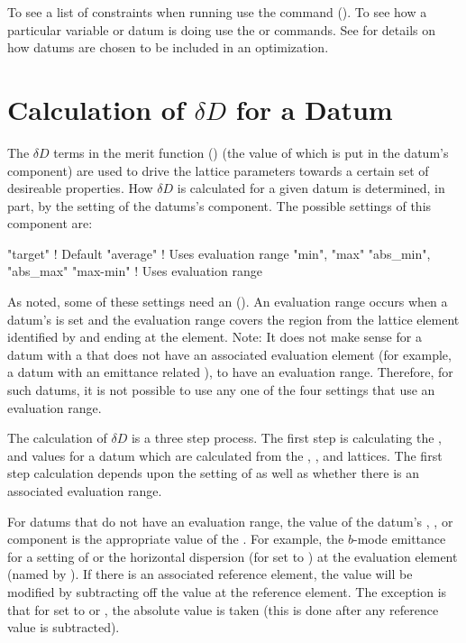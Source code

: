 To see a list of constraints when running \tao use the  command
(). To see how a particular variable or datum is doing use the  or
 commands.  See  for details on how datums are chosen to be
included in an optimization.

\section{Calculation of $\delta D$ for a Datum}
\label{s:del.d}

The $\delta D$ terms in the merit function () (the value of which is put in the datum's
 component) are used to drive the  lattice parameters towards a certain
set of desireable properties. How $\delta D$ is calculated for a given datum is determined, in part,
by the setting of the datums's  component. The possible settings of this component
are:
\begin{example}
  "target"                       ! Default
  "average"                      ! Uses evaluation range
  "min", "max"
  "abs_min", "abs_max"
  "max-min"                      ! Uses evaluation range
\end{example}
As noted, some of these settings need an  (). An evaluation
range occurs when a datum's  is set and the evaluation range covers the region
from the lattice element identified by  and ending at the  element.
Note: It does not make sense for a datum with a  that does not have an associated
evaluation element (for example, a datum with an emittance related ), to have an
evaluation range. Therefore, for such datums, it is not possible to use any one of the four
 settings that use an evaluation range.

The calculation of $\delta D$ is a three step process. The first step is calculating the
,  and  values for a datum which are calculated from the ,
, and  lattices. The first step calculation depends upon the setting of
 as well as whether there is an associated evaluation range.

For datums that do not have an evaluation range, the value of the datum's , , or
 component is the appropriate value of the . For example, the $b$-mode
emittance for a  setting of  or the horizontal dispersion (for
 set to ) at the evaluation element (named by ). If there is
an associated reference element, the value will be modified by subtracting off the 
value at the reference element. The exception is that for  set to  or
, the absolute value is taken (this is done after any reference value is subtracted).

